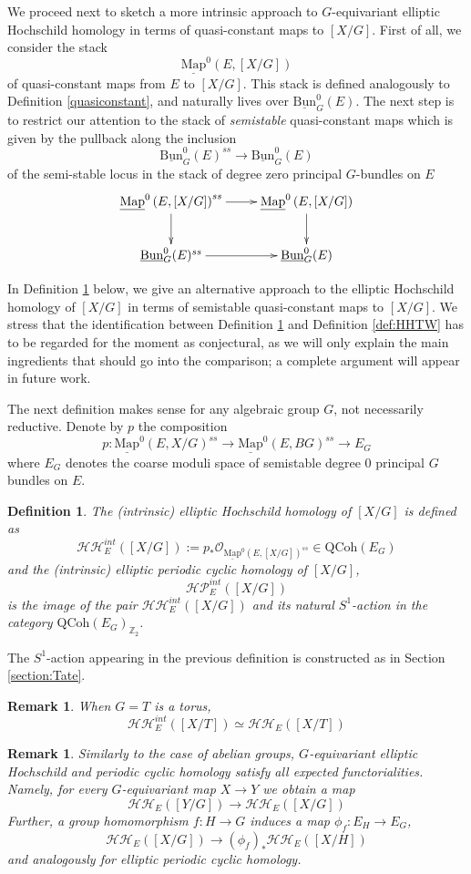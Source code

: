 \documentclass[11pt,letterpaper]{amsart}
\newtheorem{definition}[dummy]{Definition}
\newtheorem{remark}[dummy]{Remark}
\newcommand{\bZ}{\mathbb{Z}}
\newcommand{\cO}{\mathcal{O}}
\newcommand{\cHH}{\mathcal{HH}}
\newcommand{\cHP}{\mathcal{HP}}
\newcommand{\Mapo}[2]{\underline{\mathrm{Map}}^{0}\left (#1,#2\right )}
\newcommand{\Bun}{\underline{\mathrm{Bun}}}
\newcommand{\QCoh}{\mathrm{QCoh}}
\begin{document}
We proceed next to sketch a more intrinsic approach to  $G$-equivariant elliptic Hochschild homology in terms of quasi-constant maps to $[X/G]$. 
First of all, we consider the stack 
$$\Mapo{E}{[X/G]}$$
of quasi-constant maps from $E$ to $[X/G]$. This stack is defined analogously to Definition \ref{quasiconstant}, and naturally lives over $\Bun^0_G(E)$.
The next step is to restrict our attention to the stack of \emph{semistable} quasi-constant maps which is given by the pullback along the inclusion 
$$\Bun_G^{0}(E)^{ss}\to\Bun_G^0(E)$$
of the semi-stable locus in the stack of degree zero principal $G$-bundles on $E$
$$
\xymatrix{
\Mapo{E}{[X/G]}^{ss} \ar[r] \ar[d] & \Mapo{E}{[X/G]} \ar[d] \\
\Bun_G^{0}(E)^{ss}\ar[r] & \Bun_G^0(E)
}
$$

In Definition \ref{def:HHTW2} below, we give an alternative approach to the  elliptic Hochschild homology  of $[X/G]$  in terms of semistable quasi-constant maps to $[X/G]$.  We stress that the identification between Definition \ref{def:HHTW2} and Definition \ref{def:HHTW} has to be regarded for the moment as conjectural, as we will only explain the main ingredients that should go into the comparison; a complete argument will  appear in future work. 


The next definition makes sense for any algebraic group $G$, not necessarily reductive. Denote by $p$ the composition
\[
p:\Mapo{E}{X/G}^{ss}\to\Mapo{E}{BG}^{ss}\to E_G
\]
where $E_G$ denotes the coarse moduli space of semistable degree $0$ principal $G$ bundles on $E$.
\begin{definition}
\label{def:HHTW2}
The (intrinsic) \emph{elliptic Hochschild homology} of $[X/G]$ is defined as 
$$\cHH_E^{int}([X/G]):=p_\ast\cO_{\Mapo{E}{[X/G]}^{ss}}\in\QCoh(E_G)$$
and the (intrinsic) \emph{elliptic periodic cyclic homology} of $[X/G]$, 
$$\cHP_E^{int}([X/G])$$
is the image of the pair $\cHH_E^{int}([X/G])$ and its natural $S^1$-action in the category $\QCoh(E_G)_{\bZ_2}$.
\end{definition}
The $S^1$-action appearing in the previous definition is constructed as in Section \ref{section:Tate}.

\begin{remark}
When $G=T$ is a torus, 
$$\cHH_E^{int}([X/T])\simeq\cHH_E([X/T])$$
\end{remark}

\begin{remark}
Similarly to the case of abelian groups, $G$-equivariant elliptic Hochschild and periodic cyclic homology satisfy all expected functorialities. Namely, for every $G$-equivariant map $X\to Y$ we obtain a map  
\[
\cHH_E([Y/G])\to \cHH_E([X/G])
\]
Further, a group homomorphism $f:H\to G$  induces a map $\phi_f:E_H\to E_G$,
\[
\cHH_E([X/G])\to (\phi_f)_\ast\cHH_E([X/H])
\]
and analogously for elliptic periodic cyclic homology.
\end{remark}
\end{document}
